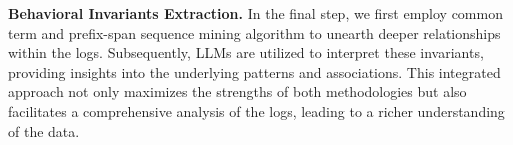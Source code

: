 \noindent
{\bf Behavioral Invariants Extraction.} In the final step, we first employ common term and prefix-span sequence mining algorithm to unearth deeper relationships within the logs. Subsequently, LLMs are utilized to interpret these invariants, providing insights into the underlying patterns and associations. This integrated approach not only maximizes the strengths of both methodologies but also facilitates a comprehensive analysis of the logs, leading to a richer understanding of the data.






